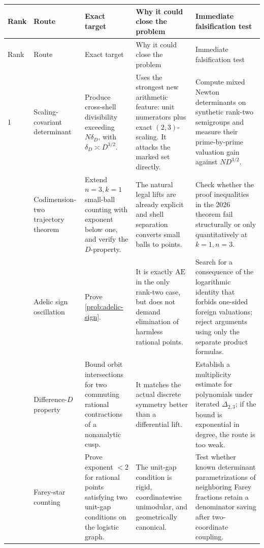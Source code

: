 \documentclass[10pt,oneside]{article}
\theoremstyle{definition}
\theoremstyle{remark}
\newcommand{\AEconj}{\mathrm{AE}}
\begin{document}
\begin{center}
\small
\setlength{\tabcolsep}{3pt}
\begin{longtable}{p{}p{}p{}p{}p{}}
\toprule
Rank & Route & Exact target & Why it could close the problem & Immediate falsification test \\
\midrule
\endfirsthead
\toprule
Rank & Route & Exact target & Why it could close the problem & Immediate falsification test \\
\midrule
\endhead
1 & Scaling-covariant determinant & Produce cross-shell divisibility exceeding \(N\delta_D\), with \(\delta_D\asymp D^{3/2}\). & Uses the strongest new arithmetic feature: unit numerators plus exact \((2,3)\)-scaling.  It attacks the marked set directly. & Compute mixed Newton determinants on synthetic rank-two semigroups and measure their prime-by-prime valuation gain against \(ND^{3/2}\). \\
\addlinespace
2 & Codimension-two trajectory theorem & Extend \(n=3,k=1\) small-ball counting with exponent below one, and verify the \(D\)-property. & The natural legal lifts are already explicit and shell separation converts small balls to points. & Check whether the proof inequalities in the 2026 theorem fail structurally or only quantitatively at \(k=1,n=3\). \\
\addlinespace
3 & Adelic sign oscillation & Prove \cref{prob:adelic-sign}. & It is exactly \(\AEconj\) in the only rank-two case, but does not demand elimination of harmless rational points. & Search for a consequence of the logarithmic identity that forbids one-sided foreign valuations; reject arguments using only the separate product formulas. \\
\addlinespace
4 & Difference-\(D\) property & Bound orbit intersections for two commuting rational contractions of a nonanalytic cusp. & It matches the actual discrete symmetry better than a differential lift. & Establish a multiplicity estimate for polynomials under iterated \(\Delta_{2,3}\); if the bound is exponential in degree, the route is too weak. \\
\addlinespace
5 & Farey-star counting & Prove exponent \(<2\) for rational points satisfying two unit-gap conditions on the logistic graph. & The unit-gap condition is rigid, coordinatewise unimodular, and geometrically canonical. & Test whether known determinant parametrizations of neighboring Farey fractions retain a denominator saving after two-coordinate coupling. \\

\end{longtable}
\end{center}
\end{document}

